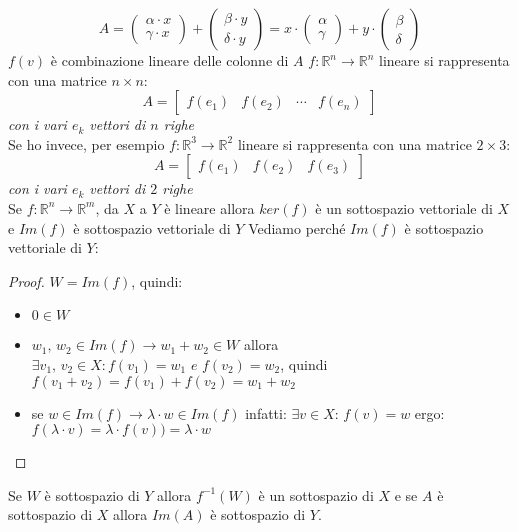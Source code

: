 \documentclass[a4paper,12pt, oneside]{book}
\begin{document}
$$A=
\left(\begin{matrix}
\alpha\cdot x\\
\gamma \cdot x
\end{matrix}\right)+\left(\begin{matrix}
\beta\cdot y\\
\delta \cdot y
\end{matrix}\right)=
x\cdot\left(\begin{matrix}
\alpha\\
\gamma 
\end{matrix}\right)+
y\cdot\left(\begin{matrix}
\beta\\
\delta 
\end{matrix}\right)
$$
$f(v)$ è combinazione lineare delle colonne di $A$
$f:\mathbb{R}^n\to \mathbb{R}^n$ lineare si rappresenta con una matrice $n\times n$:
$$
A=\left[\begin{matrix}
f(e_1) & f(e_2) & \cdots & f(e_n)
\end{matrix}\right]
$$
\textit{con i vari $e_k$ vettori di $n$ righe}\\
Se ho invece, per esempio $f:\mathbb{R}^3\to \mathbb{R}^2$ lineare si rappresenta con una matrice $2\times 3$:
$$
A=\left[\begin{matrix}
f(e_1) & f(e_2) & f(e_3)
\end{matrix}\right]
$$
\textit{con i vari $e_k$ vettori di $2$ righe}\\
\newpage
Se $f:\mathbb{R}^n\rightarrow \mathbb{R}^m$, da $X$ a $Y$ è lineare allora $ker(f)$ è un sottospazio vettoriale di $X$ e $Im(f)$ è sottospazio vettoriale di $Y$
Vediamo perché $Im(f)$ è sottospazio vettoriale di $Y$:\\
\begin{proof}
$W=Im(f)$, quindi:
\begin{itemize}
\item $0\in W$
\item $w_1,\,w_2\in Im(f)\rightarrow w_1+w_2\in W$ allora $\exists v_1,\, v_2\in X: f(v_1)=w_1 \,\, e \,\, f(v_2)=w_2$, quindi $f(v_1+v_2)=f(v_1)+f(v_2)=w_1+w_2$
\item se $w\in Im(f)\rightarrow \lambda\cdot w\in Im(f)$ infatti: $\exists v\in X:\, f(v)=w$ ergo: $f(\lambda\cdot v)=\lambda\cdot f(v))=\lambda\cdot w$
\end{itemize}
\end{proof}
Se $W$ è sottospazio di $Y$ allora $f^{-1}(W)$ è un sottospazio di $X$ e se $A$ è sottospazio di $X$ allora $Im(A)$ è sottospazio di $Y$.\\
\end{document}
